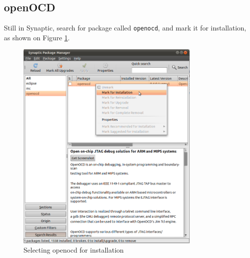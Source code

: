 \documentclass[a4paper, 10pt]{article}
\begin{document}
\subsection{openOCD}

Still in Synaptic, search for package called \verb+openocd+,
and mark it for installation, as shown on Figure \ref{fig:synaptic-openocd}.


    \begin{figure}[H]
    \centering
        \includegraphics[width=0.8\textwidth]{./png-install-guide/synaptic-openocd.png}
        \caption{Selecting openocd for installation}
        \label{fig:synaptic-openocd}
    \end{figure}



\end{document}
